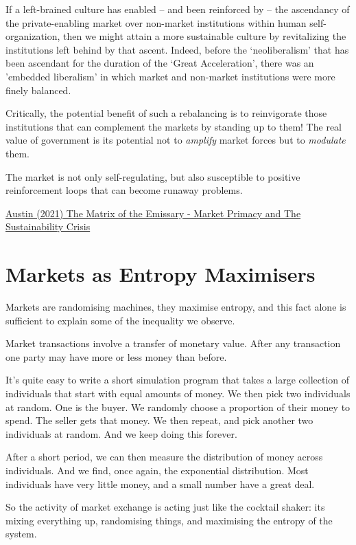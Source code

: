 \documentclass[
]{book}
\begin{document}
If a left-brained culture has enabled -- and been reinforced by -- the ascendancy of the private-enabling market over non-market institutions within human self-organization, then we might attain a more sustainable culture by revitalizing the institutions left behind by that ascent. Indeed, before the `neoliberalism' that has been ascendant for the duration of the `Great Acceleration', there was an 'embedded liberalism' in which market and non-market institutions were more finely balanced.

Critically, the potential benefit of such a rebalancing is to reinvigorate those institutions that can complement the markets by standing up to them! The real value of government is its potential not to \emph{amplify} market forces but to \emph{modulate} them.

The market is not only self-regulating, but also susceptible to positive reinforcement loops that can become runaway problems.

\href{https://channelmcgilchrist.com/articles/the-matrix-of-the-emissary/}{Austin (2021) The Matrix of the Emissary - Market Primacy and The Sustainability Crisis}

\hypertarget{markets-as-entropy-maximisers}{%
\section{Markets as Entropy Maximisers}\label{markets-as-entropy-maximisers}}

Markets are randomising machines,
they maximise entropy,
and this fact alone is sufficient to explain some of the inequality we observe.

Market transactions involve a transfer of monetary value. After any transaction one party may have more or less money than before.

It's quite easy to write a short simulation program that takes a large collection of individuals that start with equal amounts of money. We then pick two individuals at random. One is the buyer. We randomly choose a proportion of their money to spend. The seller gets that money. We then repeat, and pick another two individuals at random. And we keep doing this forever.

After a short period, we can then measure the distribution of money across individuals. And we find, once again, the exponential distribution. Most individuals have very little money, and a small number have a great deal.

So the activity of market exchange is acting just like the cocktail shaker: its mixing everything up, randomising things, and maximising the entropy of the system.
\end{document}
